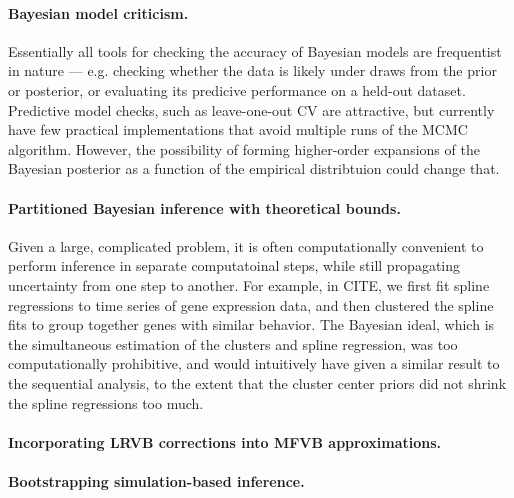 \paragraph{Bayesian model criticism.}

Essentially all tools for checking the accuracy of Bayesian models are
frequentist in nature --- e.g. checking whether the data is likely under
draws from the prior or posterior, or evaluating its predicive performance
on a held-out dataset.  Predictive model checks, such as leave-one-out
CV are attractive, but currently have few practical implementations that
avoid multiple runs of the MCMC algorithm.  However, the possibility of
forming higher-order expansions of the Bayesian posterior as a function of
the empirical distribtuion could change that.


\paragraph{Partitioned Bayesian inference with theoretical bounds.}

Given a large, complicated problem, it is often computationally convenient to
perform inference in separate computatoinal steps, while still propagating
uncertainty from one step to another.  For example, in CITE, we first fit spline
regressions to time series of gene expression data, and then clustered the
spline fits to group together genes with similar behavior.  The Bayesian ideal,
which is the simultaneous estimation of the clusters and spline regression, was
too computationally prohibitive, and would intuitively have given a similar
result to the sequential analysis, to the extent that the cluster center priors
did not shrink the spline regressions too much.


\paragraph{Incorporating LRVB corrections into MFVB approximations.}



\paragraph{Bootstrapping simulation-based inference.}

\citet{giordano2019:hoij}
\citet{efron:1994:bootstrap}
\citet{hall:2013:bootstrap}







